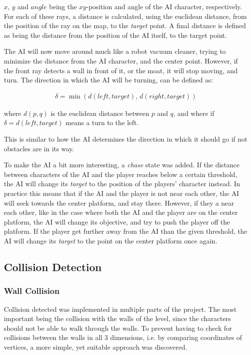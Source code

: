 \documentclass[12pt,a4paper,titlepage]{article}
\begin{document}
$x$, $y$ and $angle$ being the $xy$-position and angle of the AI character,
respectively. For each of these rays, a distance is calculated, using the
euclidean distance, from the position of the ray on the map, to the \emph{target}
point. A final distance is defined as being the distance from the position of
the AI itself, to the target point.

The AI will now move around much like a robot vacuum cleaner, trying to
minimize the distance from the AI character, and the center point. However,
if the front ray detects a wall in front of it, or the moat, it will stop
moving, and turn. The direction in which the AI will be turning, can be
defined as:

\begin{align*}
\delta = \min(d(left, target),\, d(right, target))
\end{align*}

where $d(p,q)$ is the euclidean distance between $p$ and $q$, and where if
$\delta = d(left, target)$ means a turn to the left.

This is similar to how the AI determines the direction in which it should go
if not obstacles are in its way.

To make the AI a bit more interesting, a \emph{chase} state was added. If the
distance between characters of the AI and the player reaches below a certain
threshold, the
AI will change its \emph{target} to the position of the players' character instead. In
practice this means that if the AI and the player is not near each other, the
AI will seek towards the center platform, and stay there. However, if they a near each
other, like in the case where both the AI and the player are on the center
platform, the AI will change its objective, and try to push the player off
the platform. If the player get further away from the AI than the given
threshold, the AI will change its \emph{target} to the point on the center
platform once again.

\subsection*{Collision Detection}
\label{sec-2-4}
\subsubsection*{Wall Collision}
\label{sec-2-4-1}
Collision detected was implemented in multiple parts of the project. The
most important being the collision with the walls of the level, since the
characters should not be able to walk through the walls. To prevent having
to check for collisions between the walls in all 3 dimensions, i.e. by
comparing coordinates of vertices, a more simple, yet suitable approach was
discovered.
\end{document}
